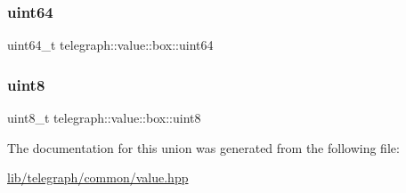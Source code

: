 \subsubsection{\texorpdfstring{uint64}{uint64}}
{\footnotesize\ttfamily uint64\+\_\+t telegraph\+::value\+::box\+::uint64}

\mbox{\label{uniontelegraph_1_1value_1_1box_a6e38aea03750a4c9c7522e594283b2ce}} 
\subsubsection{\texorpdfstring{uint8}{uint8}}
{\footnotesize\ttfamily uint8\+\_\+t telegraph\+::value\+::box\+::uint8}



The documentation for this union was generated from the following file\+:\begin{DoxyCompactItemize}
\item 
\hyperlink{lib_2telegraph_2common_2value_8hpp}{lib/telegraph/common/value.\+hpp}\end{DoxyCompactItemize}
